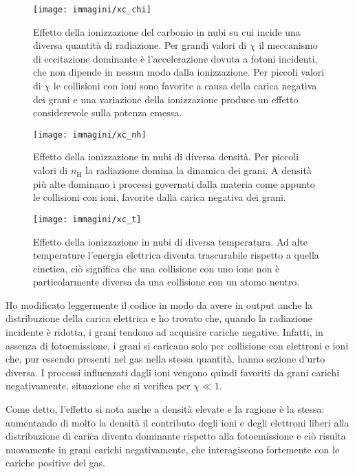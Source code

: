 \begin{figure}
	\centering
	\texttt{[image: immagini/xc\_chi]}
	\caption{Effetto della ionizzazione del carbonio in nubi su cui incide una diversa quantità di radiazione. Per grandi valori di $\chi$ il meccanismo di eccitazione dominante è l'accelerazione dovuta a fotoni incidenti, che non dipende in nessun modo dalla ionizzazione. Per piccoli valori di $\chi$ le collisioni con ioni sono favorite a causa della carica negativa dei grani e una variazione della ionizzazione produce un effetto considerevole sulla potenza emessa.}
	\label{fig:xc_chi}
\end{figure}
\begin{figure}
	\centering
	\texttt{[image: immagini/xc\_nh]}
	\caption{Effetto della ionizzazione in nubi di diversa densità. Per piccoli valori di $n_\mathrm{H}$ la radiazione domina la dinamica dei grani. A densità più alte dominano i processi governati dalla materia come appunto le collisioni con ioni, favorite dalla carica negativa dei grani.}
	\label{fig:xc_nh}
\end{figure}
\begin{figure}
	\centering
	\texttt{[image: immagini/xc\_t]}
	\caption{Effetto della ionizzazione in nubi di diversa temperatura. Ad alte temperature l'energia elettrica diventa trascurabile rispetto a quella cinetica, ciò significa che una collisione con uno ione non è particolarmente diversa da una collisione con un atomo neutro.}
	\label{fig:xc_t}
\end{figure}

Ho modificato leggermente il codice in modo da avere in output anche la distribuzione della carica elettrica e ho trovato che, quando la radiazione incidente è ridotta, i grani tendono ad acquisire cariche negative. Infatti, in assenza di fotoemissione, i grani si caricano solo per collisione con elettroni e ioni che, pur essendo presenti nel gas nella stessa quantità, hanno sezione d'urto diversa. I processi influenzati dagli ioni vengono quindi favoriti da grani carichi negativamente, situazione che si verifica per $\chi\ll1$.

Come detto, l'effetto si nota anche a densità elevate e la ragione è la stessa: aumentando di molto la densità il contributo degli ioni e degli elettroni liberi alla distribuzione di carica diventa dominante rispetto alla fotoemissione e ciò risulta nuovamente in grani carichi negativamente, che interagiscono fortemente con le cariche positive del gas.

